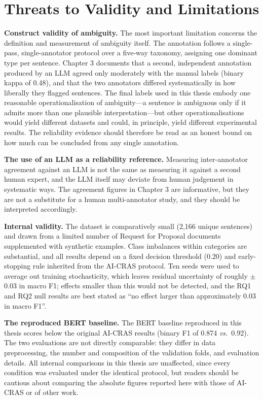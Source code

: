 \section{Threats to Validity and Limitations}

\textbf{Construct validity of ambiguity.} The most important limitation concerns the definition and measurement of ambiguity itself. The annotation follows a single-pass, single-annotator protocol over a five-way taxonomy, assigning one dominant type per sentence. Chapter 3 documents that a second, independent annotation produced by an LLM agreed only moderately with the manual labels (binary kappa of 0.48), and that the two annotators differed systematically in how liberally they flagged sentences. The final labels used in this thesis embody one reasonable operationalisation of ambiguity---a sentence is ambiguous only if it admits more than one plausible interpretation---but other operationalisations would yield different datasets and could, in principle, yield different experimental results. The reliability evidence should therefore be read as an honest bound on how much can be concluded from any single annotation.

\textbf{The use of an LLM as a reliability reference.} Measuring inter-annotator agreement against an LLM is not the same as measuring it against a second human expert, and the LLM itself may deviate from human judgement in systematic ways. The agreement figures in Chapter 3 are informative, but they are not a substitute for a human multi-annotator study, and they should be interpreted accordingly.

\textbf{Internal validity.} The dataset is comparatively small (2,166 unique sentences) and drawn from a limited number of Request for Proposal documents supplemented with synthetic examples. Class imbalances within categories are substantial, and all results depend on a fixed decision threshold (0.20) and early-stopping rule inherited from the AI-CRAS protocol. Ten seeds were used to average out training stochasticity, which leaves residual uncertainty of roughly $\pm$0.03 in macro F1; effects smaller than this would not be detected, and the RQ1 and RQ2 null results are best stated as ``no effect larger than approximately 0.03 in macro F1''.

\textbf{The reproduced BERT baseline.} The BERT baseline reproduced in this thesis scores below the original AI-CRAS results (binary F1 of 0.874 \textit{vs.}~0.92). The two evaluations are not directly comparable: they differ in data preprocessing, the number and composition of the validation folds, and evaluation details. All internal comparisons in this thesis are unaffected, since every condition was evaluated under the identical protocol, but readers should be cautious about comparing the absolute figures reported here with those of AI-CRAS or of other work.

